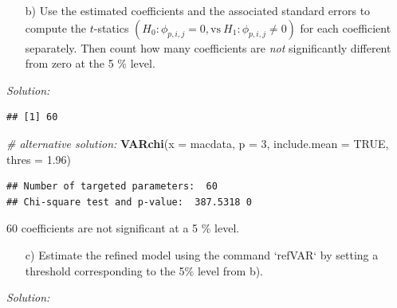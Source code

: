 \documentclass[12pt,a4paper]{article}
\newenvironment{Shaded}{\begin{snugshade}}{\end{snugshade}}
\newcommand{\CommentTok}[1]{\textcolor[rgb]{0.56,0.35,0.01}{\textit{#1}}}
\newcommand{\DataTypeTok}[1]{\textcolor[rgb]{0.13,0.29,0.53}{#1}}
\newcommand{\DecValTok}[1]{\textcolor[rgb]{0.00,0.00,0.81}{#1}}
\newcommand{\FloatTok}[1]{\textcolor[rgb]{0.00,0.00,0.81}{#1}}
\newcommand{\KeywordTok}[1]{\textcolor[rgb]{0.13,0.29,0.53}{\textbf{#1}}}
\newcommand{\NormalTok}[1]{#1}
\newcommand{\OperatorTok}[1]{\textcolor[rgb]{0.81,0.36,0.00}{\textbf{#1}}}
\newcommand{\OtherTok}[1]{\textcolor[rgb]{0.56,0.35,0.01}{#1}}
\newcommand{\StringTok}[1]{\textcolor[rgb]{0.31,0.60,0.02}{#1}}
\begin{document}
\begin{itemize}
  \item[b)] Use the estimated coefficients and the associated standard errors to compute the $t$-statics $(H_0: \phi_{p,i,j} = 0, \text{vs} \ H_1: \phi_{p,i,j} \neq 0)$ for each coefficient separately. Then count how many coefficients are \emph{not} significantly different from zero at the 5 \% level.  
\end{itemize}

\emph{Solution:}

\begin{Shaded}
\end{Shaded}

\begin{verbatim}
## [1] 60
\end{verbatim}

\begin{Shaded}
\begin{Highlighting}[]
\CommentTok{# alternative solution:}
\KeywordTok{VARchi}\NormalTok{(}\DataTypeTok{x =}\NormalTok{ macdata, }\DataTypeTok{p =} \DecValTok{3}\NormalTok{, }\DataTypeTok{include.mean =} \OtherTok{TRUE}\NormalTok{, }\DataTypeTok{thres =} \FloatTok{1.96}\NormalTok{)}
\end{Highlighting}
\end{Shaded}

\begin{verbatim}
## Number of targeted parameters:  60 
## Chi-square test and p-value:  387.5318 0
\end{verbatim}

60 coefficients are not significant at a 5 \% level.

\begin{itemize}
  \item[c)] Estimate the refined model using the command `refVAR` by setting a threshold corresponding to the 5\% level from b).
\end{itemize}

\emph{Solution:}
\end{document}
